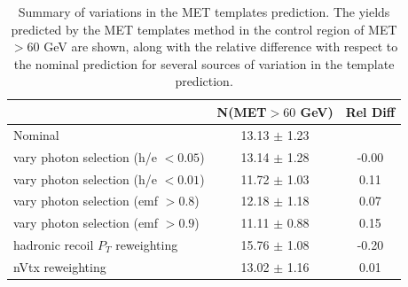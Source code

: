 \begin{table}[hbt]
\begin{center}
\caption{\label{tab:templatesyst} Summary of variations in the MET templates prediction. The yields 
predicted
by the MET templates method in the 
control region of MET$>60$ GeV 
are shown, along with the 
relative difference with respect to the nominal prediction for several sources of variation in the 
template prediction.}
\begin{tabular}{l|cc}
\hline
                                      & N(MET$>60$ GeV)   & Rel Diff    \\
\hline

Nominal                               &  13.13  $\pm$   1.23  &         \\
vary photon selection (h/e $<0.05$)   &  13.14  $\pm$   1.28  &  -0.00  \\
vary photon selection (h/e $<0.01$)   &  11.72  $\pm$   1.03  &   0.11  \\
vary photon selection (emf $>0.8$)    &  12.18  $\pm$   1.18  &   0.07  \\
vary photon selection (emf $>0.9$)    &  11.11  $\pm$   0.88  &   0.15  \\
hadronic recoil $P_T$ reweighting     &  15.76  $\pm$   1.08  &  -0.20  \\
nVtx reweighting                      &  13.02  $\pm$   1.16  &   0.01  \\


\hline
\end{tabular}
\end{center}
\end{table}
